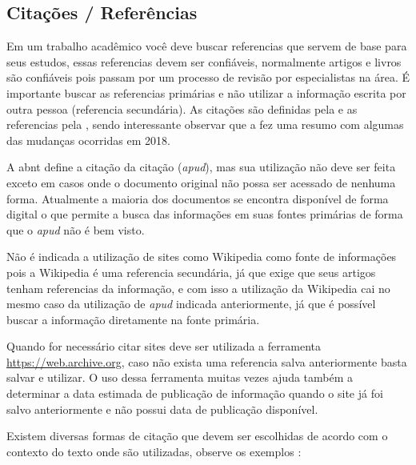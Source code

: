 \subsection{Citações / Referências}
\label{referencias}

Em um trabalho acadêmico você deve buscar referencias que servem de base para seus estudos, essas referencias devem ser confiáveis, normalmente artigos e livros são confiáveis pois passam por um processo de revisão por especialistas na área. É importante buscar as referencias primárias e não utilizar a informação escrita por outra pessoa (referencia secundária). As citações são definidas pela  e as referencias pela , sendo interessante observar que a  fez uma resumo com algumas das mudanças ocorridas em 2018.


A \ac{abnt} define a citação da citação (\textit{apud}), mas sua utilização não deve ser feita exceto em casos onde o documento original não possa ser acessado de nenhuma forma. Atualmente a maioria dos documentos se encontra disponível de forma digital o que permite a busca das informações em suas fontes primárias de forma que o \textit{apud} não é bem visto. 

Não é indicada a utilização de sites como Wikipedia como fonte de informações pois a Wikipedia é uma referencia secundária, já que exige que seus artigos tenham referencias da informação, e com isso a utilização da Wikipedia cai no mesmo caso da utilização de \textit{apud} indicada anteriormente, já que é possível buscar a informação diretamente na fonte primária.

Quando for necessário citar sites deve ser utilizada a ferramenta \url{https://web.archive.org}, caso não exista uma referencia salva anteriormente basta salvar e utilizar. O uso dessa ferramenta muitas vezes ajuda também a determinar a data estimada de publicação de informação quando o site já foi salvo anteriormente e não possui data de publicação disponível.



Existem diversas formas de citação que devem ser escolhidas de acordo com o contexto do texto onde são utilizadas, observe os exemplos :

